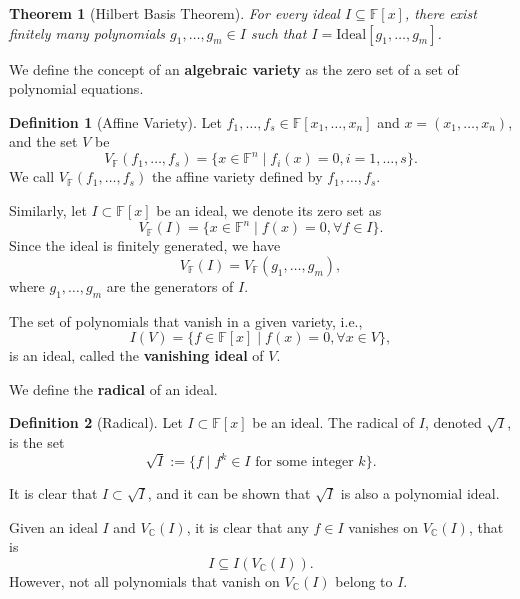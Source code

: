 \documentclass[
]{book}
\newtheorem{theorem}{Theorem}[chapter]
\theoremstyle{definition}
\newtheorem{definition}{Definition}[chapter]
\theoremstyle{definition}
\theoremstyle{definition}
\theoremstyle{definition}
\theoremstyle{remark}
\begin{document}
\begin{theorem}[Hilbert Basis Theorem]
\protect\hypertarget{thm:HilbertBasisTheorem}{}\label{thm:HilbertBasisTheorem}For every ideal \(I \subseteq \mathbb{F}[x]\), there exist finitely many polynomials \(g_1,\dots,g_m \in I\) such that \(I = \mathrm{Ideal}[g_1,\dots,g_m]\).
\end{theorem}

We define the concept of an \textbf{algebraic variety} as the zero set of a set of polynomial equations.

\begin{definition}[Affine Variety]
\protect\hypertarget{def:AffineVariety}{}\label{def:AffineVariety}Let \(f_1,\dots,f_s \in \mathbb{F}[x_1,\dots,x_n]\) and \(x = (x_1,\dots,x_n)\), and the set \(V\) be
\[
V_{\mathbb{F}}(f_1,\dots,f_s) = \{ x \in \mathbb{F}^{n}\mid f_i(x) = 0, i=1,\dots,s \}.
\]
We call \(V_{\mathbb{F}}(f_1,\dots,f_s)\) the affine variety defined by \(f_1,\dots,f_s\).
\end{definition}

Similarly, let \(I \subset \mathbb{F}[x]\) be an ideal, we denote its zero set as
\[
V_{\mathbb{F}}(I) = \{ x \in \mathbb{F}^n \mid f(x) = 0, \forall f \in I \}.
\]
Since the ideal is finitely generated, we have
\[
V_{\mathbb{F}}(I) = V_{\mathbb{F}}(g_1,\dots,g_m),
\]
where \(g_1,\dots,g_m\) are the generators of \(I\).

The set of polynomials that vanish in a given variety, i.e.,
\[
I(V)= \{ f \in \mathbb{F}[x] \mid f(x) = 0, \forall x \in V \},
\]
is an ideal, called the \textbf{vanishing ideal} of \(V\).

We define the \textbf{radical} of an ideal.

\begin{definition}[Radical]
\protect\hypertarget{def:Radical}{}\label{def:Radical}Let \(I \subset \mathbb{F}[x]\) be an ideal. The radical of \(I\), denoted \(\sqrt{I}\), is the set
\[
\sqrt{I} := \{ f \mid f^k \in I \text{ for some integer }k \}.
\]
\end{definition}

It is clear that \(I \subset \sqrt{I}\), and it can be shown that \(\sqrt{I}\) is also a polynomial ideal.

Given an ideal \(I\) and \(V_{\mathbb{C}}(I)\), it is clear that any \(f \in I\) vanishes on \(V_{\mathbb{C}}(I)\), that is
\[
I \subseteq I(V_{\mathbb{C}}(I)).
\]
However, not all polynomials that vanish on \(V_{\mathbb{C}}(I)\) belong to \(I\).
\end{document}
